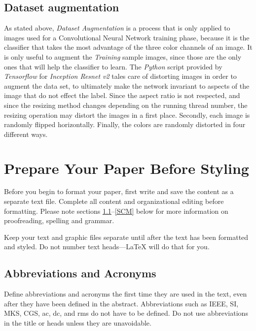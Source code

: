 \documentclass[conference]{IEEEtran}
\begin{document}
\subsection{Dataset augmentation}
As stated above, \emph{Dataset Augmentation} is a process that is only applied to images used for a Convolutional Neural Network training phase, because it is the classifier that takes the most advantage of the three color channels of an image. It is only useful to augment the \emph{Training} sample images, since those are the only ones that will help the classifier to learn.
The \emph{Python} script provided by \emph{Tensorflow} for \emph{Inception Resnet v2} tales care of distorting images in order to augment the data set, to ultimately make the network invariant to aspects of the image that do not effect the label. Since the aspect ratio is not respected, and since the resizing method changes depending on the running thread number, the resizing operation may distort the images in a first place. Secondly, each image is randomly flipped horizontally. Finally, the colors are randomly distorted in four different ways.

\section{Prepare Your Paper Before Styling}
Before you begin to format your paper, first write and save the content as a 
separate text file. Complete all content and organizational editing before 
formatting. Please note sections \ref{AA}--\ref{SCM} below for more information on 
proofreading, spelling and grammar.

Keep your text and graphic files separate until after the text has been 
formatted and styled. Do not number text heads---{\LaTeX} will do that 
for you.

\subsection{Abbreviations and Acronyms}\label{AA}
Define abbreviations and acronyms the first time they are used in the text, 
even after they have been defined in the abstract. Abbreviations such as 
IEEE, SI, MKS, CGS, ac, dc, and rms do not have to be defined. Do not use 
abbreviations in the title or heads unless they are unavoidable.
\end{document}
